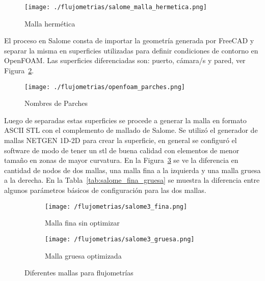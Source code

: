 \begin{figure}[h!]
    \centering
    \texttt{[image: ./flujometrias/salome\_malla\_hermetica.png]}
    \caption{Malla hermética}\label{fig:salome_malla_hermetica}
\end{figure}

El proceso en Salome consta de importar la geometría generada por FreeCAD y
separar la misma en superficies utilizadas para definir condiciones de contorno
en OpenFOAM.
%
Las superficies diferenciadas son: puerto, cámara/s y pared, ver
Figura~\ref{fig:openfoam_parches}.

\begin{figure}[h!]
    \centering
    \texttt{[image: ./flujometrias/openfoam\_parches.png]}
    \caption{Nombres de Parches}\label{fig:openfoam_parches}
\end{figure}

Luego de separadas estas superficies se procede a generar la malla en formato
ASCII STL con el complemento de mallado de Salome.
%
Se utilizó el generador de mallas NETGEN 1D-2D para crear la superficie, en
general se configuró el software de modo de tener un stl de buena calidad con
elementos de menor tamaño en zonas de mayor curvatura.
%
En la Figura~\ref{fig:salome_fina_gruesa} se ve la diferencia en cantidad de
nodos de dos mallas, una malla fina a la izquierda y una malla gruesa a la
derecha.
%
En la Tabla~\ref{tab:salome_fina_gruesa} se muestra la diferencia entre algunos
parámetros básicos de configuración para las dos mallas.
%

\begin{figure}[h!]
    \centering
    \begin{subfigure}[t]{0.5\textwidth}
        \centering
        \texttt{[image: /flujometrias/salome3\_fina.png]}
        \caption{Malla fina sin optimizar}
    \end{subfigure}%
    \begin{subfigure}[t]{0.5\textwidth}
        \centering
        \texttt{[image: /flujometrias/salome3\_gruesa.png]}
        \caption{Malla gruesa optimizada}
    \end{subfigure}
    \caption{Diferentes mallas para flujometrías}\label{fig:salome_fina_gruesa}
\end{figure}

